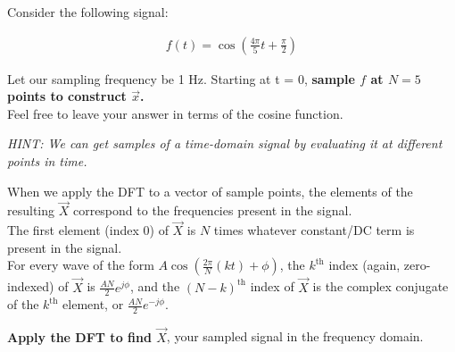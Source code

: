 \begin{enumerate}

\qitem

Consider the following signal:

\begin{align*}
f(t) = \cos(\frac{4\pi}{5}t + \frac{\pi}{2})
\end{align*}

Let our sampling frequency be 1 Hz. Starting at t = 0, {\bf sample $f$ at $N = 5$ points to construct $\vec{x}$. } \\
Feel free to leave your answer in terms of the cosine function.

{\em HINT:
We can get samples of a time-domain signal by evaluating it at different points in time. \\
}


\vspace{0.5em}
When we apply the DFT to a vector of sample points, the elements of the resulting $\vec{X}$ correspond to the frequencies present in the signal. \\
The first element (index 0) of $\vec{X}$ is $N$ times whatever constant/DC term is present in the signal. \\
For every wave of the form $A\cos(\frac{2\pi}{N}(kt) + \phi)$, the $k^{\text{th}}$ index (again, zero-indexed) of $\vec{X}$ is $\frac{AN}{2}e^{j\phi}$, 
and the $(N - k)^{\text{th}}$ index of $\vec{X}$ is the complex conjugate of the $k^{\text{th}}$ element, or $\frac{AN}{2}e^{-j\phi}$.

\qitem
{\bf Apply the DFT to find $\vec{X}$}, your sampled signal in the frequency domain.


\end{enumerate}
